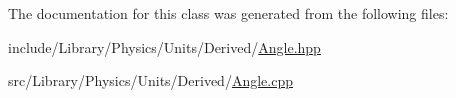 The documentation for this class was generated from the following files\+:\begin{DoxyCompactItemize}
\item 
include/\+Library/\+Physics/\+Units/\+Derived/\hyperlink{_angle_8hpp}{Angle.\+hpp}\item 
src/\+Library/\+Physics/\+Units/\+Derived/\hyperlink{_angle_8cpp}{Angle.\+cpp}\end{DoxyCompactItemize}
